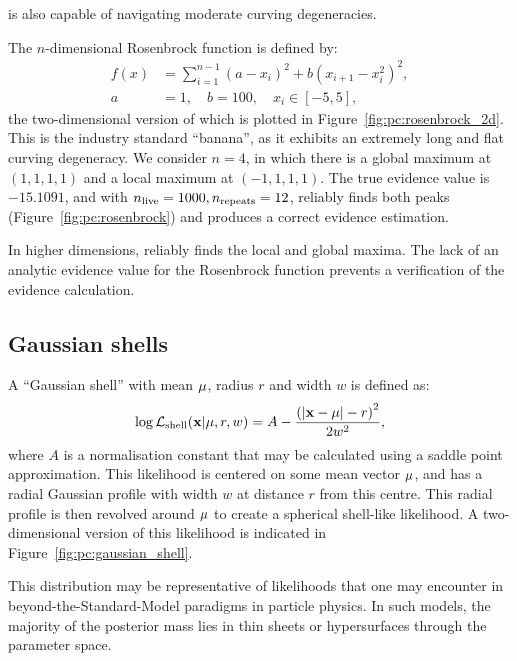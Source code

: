 \PolyChord{} is also capable of navigating moderate curving degeneracies. 

The \(n\)-dimensional Rosenbrock function is defined by:
\begin{align}
  f(x) &= \sum\limits_{i=1}^{n-1}   {(a-x_i)}^2+ b {(x_{i+1} -x_i^2 )}^2,
    \label{eqn:pc:rosenbrock}
    \\
    a&=1,\quad b=100,\quad x_i\in[-5,5],
\end{align}
the two-dimensional version of which is plotted in Figure~\ref{fig:pc:rosenbrock_2d}. This is the industry standard ``banana'', as it exhibits an extremely long and flat curving degeneracy. We consider \({n=4}\), in which there is a global maximum at \((1,1,1,1)\) and a local maximum at \((-1,1,1,1)\). The true evidence value is \(-15.1091\), and with \(n_{\mathrm{live}}=1000,n_{\mathrm{repeats}}=12\), \PolyChord{} reliably finds both peaks (Figure~\ref{fig:pc:rosenbrock}) and produces a correct evidence estimation.

In higher dimensions, \PolyChord{} reliably finds the local and global maxima. The lack of an analytic evidence value for the Rosenbrock function prevents a verification of the evidence calculation.

\subsection{Gaussian shells}
\label{sec:pc:gaussian_shells}

A ``Gaussian shell'' with mean \(\mathbf{\mu}\), radius \(r\) and width \(w\) is defined as:
\begin{equation}
  \log\mathcal{L}_{\mathrm{shell}}(\mathbf{x}|\mathbf{\mu},r,w) = A - \frac{{\left(\left|\mathbf{x} - \mathbf{\mu}\right|- r\right)}^2}{2w^2},
  \label{eqn:pc:gaussian_shell}
\end{equation}
where \(A\) is a normalisation constant that may be calculated using a saddle point approximation.
This likelihood is centered on some mean vector \(\mathbf{\mu}\), and has a radial Gaussian profile with width \(w\) at distance \(r\) from this centre. This radial profile is then revolved around \(\mathbf{\mu}\) to create a spherical shell-like likelihood. A two-dimensional version of this likelihood is indicated in Figure~\ref{fig:pc:gaussian_shell}.

This distribution may be representative of likelihoods that one may encounter in beyond-the-Standard-Model paradigms in particle physics. In such models, the majority of the posterior mass lies in thin sheets or hypersurfaces through the parameter space.

